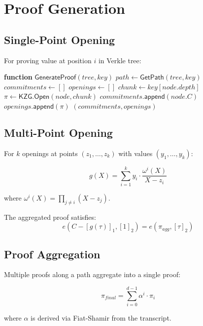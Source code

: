 \section{Proof Generation}


\subsection{Single-Point Opening}

For proving value at position $i$ in Verkle tree:

\begin{algorithmic}[1]
\STATE \textbf{function} $\mathsf{GenerateProof}(tree, key)$
\STATE $path \gets \mathsf{GetPath}(tree, key)$
\STATE $commitments \gets []$
\STATE $openings \gets []$
    \STATE $chunk \gets key[node.depth]$
    \STATE $\pi \gets \mathsf{KZG.Open}(node, chunk)$
    \STATE $commitments.\mathsf{append}(node.C)$
    \STATE $openings.\mathsf{append}(\pi)$
\ENDFOR
\RETURN $(commitments, openings)$
\end{algorithmic}

\subsection{Multi-Point Opening}

For $k$ openings at points $(z_1, \ldots, z_k)$ with values $(y_1, \ldots, y_k)$:

\begin{equation}
    g(X) = \sum_{i=1}^{k} y_i \cdot \frac{\omega^i(X)}{X - z_i}
\end{equation}

where $\omega^i(X) = \prod_{j \neq i}(X - z_j)$.

The aggregated proof satisfies:
\begin{equation}
    e(C - [g(\tau)]_1, [1]_2) = e(\pi_{agg}, [\tau]_2)
\end{equation}

\subsection{Proof Aggregation}

Multiple proofs along a path aggregate into a single proof:

\begin{equation}
    \pi_{final} = \sum_{i=0}^{d-1} \alpha^i \cdot \pi_i
\end{equation}

where $\alpha$ is derived via Fiat-Shamir from the transcript.

